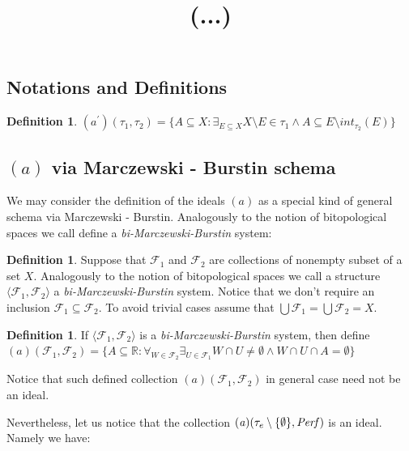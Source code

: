 \documentclass[12pt]{amsart}
\theoremstyle{plain}
\theoremstyle{definition}
\newtheorem{definition}[theorem]{Definition}
\theoremstyle{remark}
\newcommand{\Perf}{{\it Perf}}
\newcommand{\real}{\mathbb{R}}
\newcommand{\cF}{{\mathcal F}}
\newcommand{\mathint}{\mathit{int}}
\newcommand{\aideal}{\mathit{(a)}}
\newcommand{\aidealprime}{\mathit{(a^\prime)}}
\newcommand{\biMB}{bi-Marczewski-Burstin}
\begin{document}
\title{(...)}

\maketitle

\subsection{Notations and Definitions}
\begin{definition}
\label{definition:a_prime}
$\aidealprime(\tau_1, \tau_2) = \lbrace A \subseteq X\colon \exists_{E \subseteq X} 
X\setminus E \in \tau_1 \wedge A \subseteq E \setminus  \mathint_{\tau_2}(E) \rbrace$
\end{definition}

\subsection{$\aideal$ via Marczewski - Burstin schema}

We may consider the definition of the ideals $\aideal$
as a special kind of general schema via Marczewski - Burstin.
Analogously to the notion of bitopological spaces we call define
a {\it\biMB{}} system:

\begin{definition}
Suppose that $\cF_1$ and $\cF_2$ are collections of nonempty
subset of a set $X$. 
Analogously to the notion of bitopological spaces we call a structure
$\langle \cF_1, \cF_2 \rangle$ a {\it\biMB{}} system.
Notice that we don't require an inclusion $\cF_1 \subseteq \cF_2$.
To avoid trivial cases assume that $\bigcup \cF_1 = \bigcup \cF_2 = X$.
\end{definition}

\begin{definition}
If $\langle \cF_1, \cF_2 \rangle$ is a {\it\biMB{}} system,
then define 
$\aideal(\cF_1, \cF_2) = \lbrace A \subseteq \real\colon 
\forall_{W\in \cF_2} \exists_{U \in \cF_1}
W \cap U \not= \emptyset \wedge W \cap U \cap A = \emptyset
\rbrace$ 
\end{definition}

Notice that such defined collection $\aideal(\cF_1, \cF_2)$
in general case need not be an ideal.

Nevertheless, let us notice that the collection
$\aideal(\tau_e\setminus\lbrace\emptyset\rbrace, \Perf)$ is an ideal. Namely we have:
\end{document}
